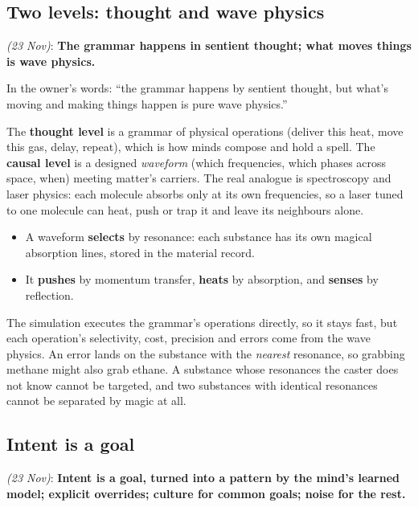 \documentclass[11pt,a4paper]{article}
\newcommand{\decision}[3]{\par\smallskip\noindent{\color{dec}\textbf{Decision #1}} \textit{(#2)}: \textbf{#3}\par}
\begin{document}
\subsection{Two levels: thought and wave physics}

\decision{Q3.1}{23 Nov}{The grammar happens in sentient thought; what moves things is wave physics.}

In the owner's words: ``the grammar happens by sentient thought, but what's moving and making things happen is pure wave physics.''

The \textbf{thought level} is a grammar of physical operations (deliver this heat, move this gas, delay, repeat), which is how minds compose and hold a spell. The \textbf{causal level} is a designed \emph{waveform} (which frequencies, which phases across space, when) meeting matter's carriers. The real analogue is spectroscopy and laser physics: each molecule absorbs only at its own frequencies, so a laser tuned to one molecule can heat, push or trap it and leave its neighbours alone.
\begin{itemize}
  \item A waveform \textbf{selects} by resonance: each substance has its own magical absorption lines, stored in the material record.
  \item It \textbf{pushes} by momentum transfer, \textbf{heats} by absorption, and \textbf{senses} by reflection.
\end{itemize}
The simulation executes the grammar's operations directly, so it stays fast, but each operation's selectivity, cost, precision and errors come from the wave physics. An error lands on the substance with the \emph{nearest} resonance, so grabbing methane might also grab ethane. A substance whose resonances the caster does not know cannot be targeted, and two substances with identical resonances cannot be separated by magic at all.

\subsection{Intent is a goal}

\decision{Q3.2}{23 Nov}{Intent is a goal, turned into a pattern by the mind's learned model; explicit overrides; culture for common goals; noise for the rest.}
\end{document}
